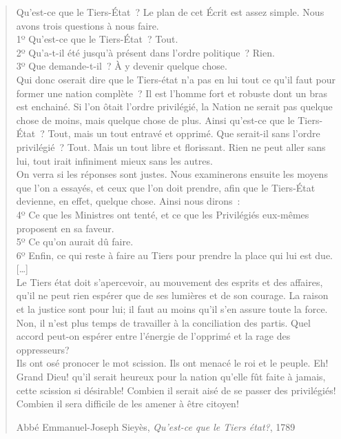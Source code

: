 \documentclass[
  french,
  letterpaper,
  DIV=11,
  numbers=noendperiod]{scrartcl}
\begin{document}
\begin{quote}
Qu'est-ce que le Tiers-État~? Le plan de cet Écrit est assez simple.
Nous avons trois questions à nous faire.\\
1º Qu'est-ce que le Tiers-État~? Tout.\\
2º Qu'a-t-il été jusqu'à présent dans l'ordre politique~? Rien.\\
3º Que demande-t-il~? À y devenir quelque chose.\\
Qui donc oserait dire que le Tiers-état n'a pas en lui tout ce qu'il
faut pour former une nation complète~? Il est l'homme fort et robuste
dont un bras est enchainé. Si l'on ôtait l'ordre privilégié, la Nation
ne serait pas quelque chose de moins, mais quelque chose de plus. Ainsi
qu'est-ce que le Tiers-État~? Tout, mais un tout entravé et opprimé. Que
serait-il sans l'ordre privilégié~? Tout. Mais un tout libre et
florissant. Rien ne peut aller sans lui, tout irait infiniment mieux
sans les autres.\\
On verra si les réponses sont justes. Nous examinerons ensuite les
moyens que l'on a essayés, et ceux que l'on doit prendre, afin que le
Tiers-État devienne, en effet, quelque chose. Ainsi nous dirons~:\\
4º Ce que les Ministres ont tenté, et ce que les Privilégiés eux-mêmes
proposent en sa faveur.\\
5º Ce qu'on aurait dû faire.\\
6º Enfin, ce qui reste à faire au Tiers pour prendre la place qui lui
est due.\\
{[}\ldots{]}\\
Le Tiers état doit s'apercevoir, au mouvement des esprits et des
affaires, qu'il ne peut rien espérer que de ses lumières et de son
courage. La raison et la justice sont pour lui; il faut au moins qu'il
s'en assure toute la force. Non, il n'est plus temps de travailler à la
conciliation des partis. Quel accord peut-on espérer entre l'énergie de
l'opprimé et la rage des oppresseurs?\\
Ils ont osé pronocer le mot scission. Ils ont menacé le roi et le
peuple. Eh! Grand Dieu! qu'il serait heureux pour la nation qu'elle fût
faite à jamais, cette scission si désirable! Combien il serait aisé de
se passer des privilégiés! Combien il sera difficile de les amener à
être citoyen!

Abbé Emmanuel-Joseph Sieyès, \emph{Qu'est-ce que le Tiers état?}, 1789
\end{quote}
\end{document}
